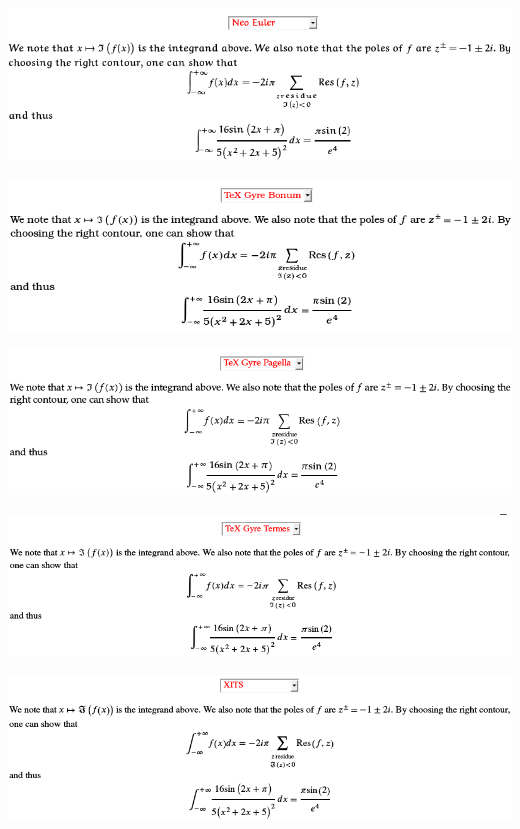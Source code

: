 \includegraphics[width=\textwidth]{screenshots/4-mathml-fonts-neo-euler}

\includegraphics[width=\textwidth]{screenshots/4-mathml-fonts-tex-gyre-bonum}

\includegraphics[width=\textwidth]{screenshots/4-mathml-fonts-tex-gyre-pagella}

\includegraphics[width=\textwidth]{screenshots/4-mathml-fonts-tex-gyre-termes}

\includegraphics[width=\textwidth]{screenshots/4-mathml-fonts-xits}

